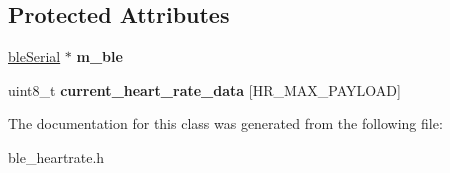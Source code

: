 \subsection*{Protected Attributes}
\begin{DoxyCompactItemize}
\item 
\hypertarget{classble_heart_rate_a4b2941fe6376aa0c2229a631cfb64eec}{\hyperlink{classble_serial}{ble\-Serial} $\ast$ {\bfseries m\-\_\-ble}}\label{classble_heart_rate_a4b2941fe6376aa0c2229a631cfb64eec}

\item 
\hypertarget{classble_heart_rate_a2414001c40522470ae58ddf572f98b52}{uint8\-\_\-t {\bfseries current\-\_\-heart\-\_\-rate\-\_\-data} \mbox{[}H\-R\-\_\-\-M\-A\-X\-\_\-\-P\-A\-Y\-L\-O\-A\-D\mbox{]}}\label{classble_heart_rate_a2414001c40522470ae58ddf572f98b52}

\end{DoxyCompactItemize}


The documentation for this class was generated from the following file\-:\begin{DoxyCompactItemize}
\item 
ble\-\_\-heartrate.\-h\end{DoxyCompactItemize}
